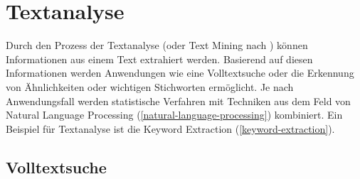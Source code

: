 

\cite{manning1999foundations,brill1992simple,brill1994some}










\section{\gls{Textanalyse}}


Durch den Prozess der \gls{Textanalyse} (oder Text Mining nach \cite{tan1999text}) können Informationen aus einem Text extrahiert werden. Basierend auf diesen Informationen werden Anwendungen wie eine \gls{Volltextsuche} oder die Erkennung von Ähnlichkeiten oder wichtigen Stichworten ermöglicht. Je nach Anwendungsfall werden statistische Verfahren mit Techniken aus dem Feld von \gls{Natural Language Processing} (\autoref{natural-language-processing}) kombiniert. Ein Beispiel für \gls{Textanalyse} ist die \gls{Keyword Extraction} (\autoref{keyword-extraction}). 



\subsection{\gls{Volltextsuche}}

